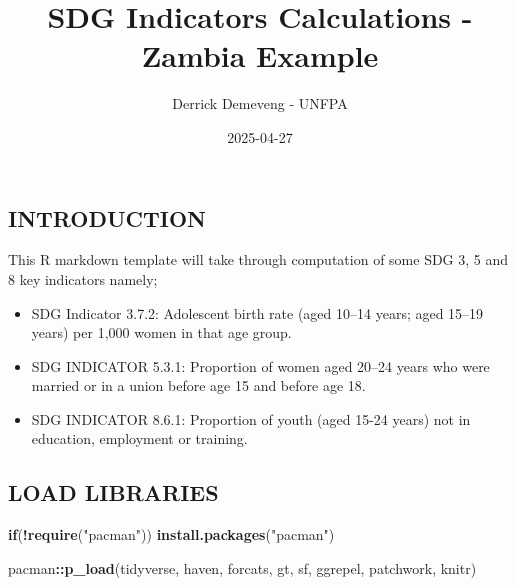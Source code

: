 \documentclass[
]{article}
\title{SDG Indicators Calculations - Zambia Example}
\author{Derrick Demeveng - UNFPA}
\date{2025-04-27}
\newenvironment{Shaded}{\begin{snugshade}}{\end{snugshade}}
\newcommand{\ControlFlowTok}[1]{\textcolor[rgb]{0.13,0.29,0.53}{\textbf{#1}}}
\newcommand{\FunctionTok}[1]{\textcolor[rgb]{0.13,0.29,0.53}{\textbf{#1}}}
\newcommand{\NormalTok}[1]{#1}
\newcommand{\SpecialCharTok}[1]{\textcolor[rgb]{0.81,0.36,0.00}{\textbf{#1}}}
\newcommand{\StringTok}[1]{\textcolor[rgb]{0.31,0.60,0.02}{#1}}
\newenvironment{UNFPAShadedBox}{%
\begin{tcolorbox}[sharp corners, enhanced, colback=white, boxrule=0pt, borderline west={2pt}{0pt}{orange}]%
}{\end{tcolorbox}}
\newenvironment{Highlighting}{\begin{UNFPAShadedBox}}{\end{UNFPAShadedBox}}
\begin{document}
\maketitle

{
\setcounter{tocdepth}{2}
\tableofcontents
}
\subsection{INTRODUCTION}\label{introduction}

This R markdown template will take through computation of some SDG 3, 5
and 8 key indicators namely;

\begin{itemize}
\item
  SDG Indicator 3.7.2: Adolescent birth rate (aged 10--14 years; aged
  15--19 years) per 1,000 women in that age group.
\item
  SDG INDICATOR 5.3.1: Proportion of women aged 20--24 years who were
  married or in a union before age 15 and before age 18.
\item
  SDG INDICATOR 8.6.1: Proportion of youth (aged 15-24 years) not in
  education, employment or training.
\end{itemize}

\subsection{LOAD LIBRARIES}\label{load-libraries}

\begin{Shaded}
\begin{Highlighting}[]
\ControlFlowTok{if}\NormalTok{(}\SpecialCharTok{!}\FunctionTok{require}\NormalTok{(}\StringTok{"pacman"}\NormalTok{)) }\FunctionTok{install.packages}\NormalTok{(}\StringTok{"pacman"}\NormalTok{)}

\NormalTok{pacman}\SpecialCharTok{::}\FunctionTok{p\_load}\NormalTok{(tidyverse, haven, forcats, gt, sf, ggrepel, patchwork, knitr)}
\end{Highlighting}
\end{Shaded}
\end{document}
